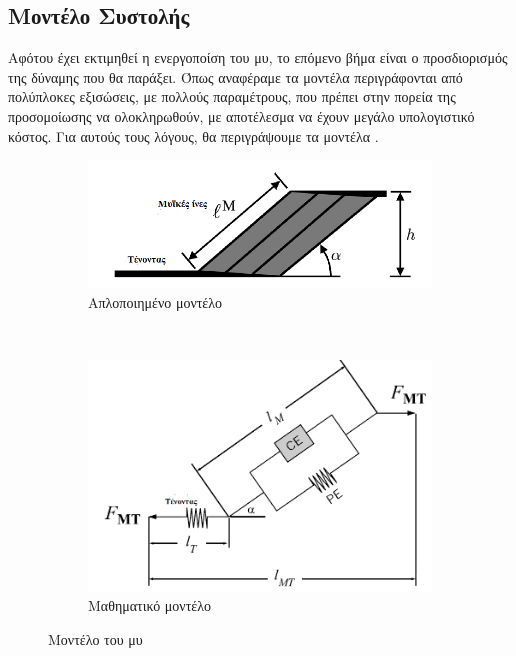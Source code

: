 \subsection{Μοντέλο Συστολής}

Αφότου έχει εκτιμηθεί η ενεργοποίση  του μυ, το επόμενο βήμα είναι ο προσδιορισμός της δύναμης που θα παράξει. Όπως αναφέραμε τα μοντέλα  περιγράφονται από πολύπλοκες εξισώσεις, με πολλούς παραμέτρους, που πρέπει στην πορεία της προσομοίωσης να ολοκληρωθούν, με αποτέλεσμα να έχουν μεγάλο υπολογιστικό κόστος. Για αυτούς τους λόγους, θα περιγράψουμε τα μοντέλα .

\begin{figure}[H]
    \centering
    \begin{subfigure}[Η]{.5\textwidth}
        \includegraphics[width=\textwidth]{musculoskeletal/fig/simple-muscle-model.png}
        \caption{Απλοποιημένο μοντέλο\cite{millard13}}
        \label{fig:simple-mascle-model}
    \end{subfigure} ~
    \begin{subfigure}[Η]{.4\textwidth}
        \includegraphics[width=\textwidth]{musculoskeletal/fig/muscle-model.png}
        \caption{Μαθηματικό μοντέλο\cite{erdemir07}}
        \label{fig:muscle-model}
    \end{subfigure}
    \caption{Μοντέλο του μυ}
\end{figure}

